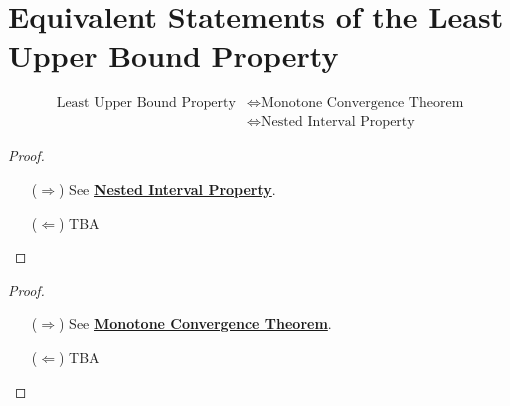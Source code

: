 \documentclass[11pt,openany]{article}
\begin{document}
\section{Equivalent Statements of the Least Upper Bound Property}
\begin{align*}
\text{Least Upper Bound Property}&\iff\text{Monotone Convergence Theorem}\\
&\iff\text{Nested Interval Property}
\end{align*}

\begin{proof}
\begin{enumerate}
\item[($\Rightarrow$)] See \hyperlink{nip}{\textbf{Nested Interval Property}}.
\item[($\Leftarrow$)] TBA
\end{enumerate}
\end{proof}
\begin{proof}
\begin{enumerate}
\item[($\Rightarrow$)] See \hyperlink{mct}{\textbf{Monotone Convergence Theorem}}.
\item[($\Leftarrow$)] TBA
\end{enumerate}
\end{proof}
\end{document}
